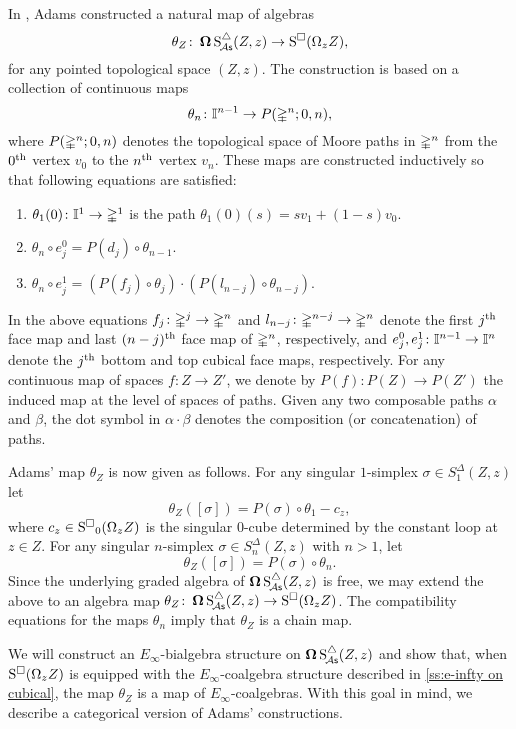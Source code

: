 In \cite{adams1956cobar}, Adams constructed a natural map of algebras
\begin{equation} \label{e:adams map 2}
\theta_Z \colon \operatorname{\mathbf{\Omega}} \operatorname{S^{\triangle}_{\!{\mathcal{A}\mathsf{s}}}}(Z,z) \to \operatorname{S^{\square}}(\Omega_z Z),
\end{equation}
for any pointed topological space $(Z,z)$.
The construction is based on a collection of continuous maps
\[
\theta_n \colon \mathbb{I}^{n-1} \to P(\mathbb{\Delta}^n;0,n),
\]
where $P(\mathbb{\Delta}^n;0,n)$ denotes the topological space of Moore paths in $\mathbb{\Delta}^n$ from the $0^{\mathrm{th}}$ vertex $v_0$ to the $n^{\mathrm{th}}$ vertex $v_n$.
These maps are constructed inductively so that following equations are satisfied:
\begin{enumerate}
	\item $\theta_1(0)\colon \mathbb{I}^1 \to \mathbb{\Delta}^1$ is the path $\theta_1(0)(s) = sv_1 +(1-s)v_0$.
	\item $\theta_n \circ e_j^0 = P(d_j) \circ \theta_{n-1}$.
	\item $\theta_n \circ e_j^1 = (P(f_j) \circ \theta_j) \cdot (P(l_{n-j}) \circ \theta_{n-j})$.
\end{enumerate}
In the above equations $f_j\colon \mathbb{\Delta}^j \rightarrow \mathbb{\Delta}^n$ and $l_{n-j}\colon \mathbb{\Delta}^{n-j} \rightarrow \mathbb{\Delta}^n$ denote the first $j^{\mathrm{th}}$ face map and last $(n-j)^{\mathrm{th}}$ face map of $\mathbb{\Delta}^n$, respectively, and
$e_j^0,e_j^1\colon \mathbb{I}^{n-1} \rightarrow \mathbb{I}^{n}$ denote the $j^{\mathrm{th}}$ bottom and top cubical face maps, respectively.
For any continuous map of spaces $f \colon Z \to Z'$, we denote by $P(f) \colon P(Z) \to P(Z')$ the induced map at the level of spaces of paths.
Given any two composable paths $\alpha$ and $\beta$, the dot symbol in $\alpha \cdot \beta$ denotes the composition (or concatenation) of paths.

Adams' map $\theta_Z$ is now given as follows.
For any singular $1$-simplex $\sigma \in S^{\Delta}_1(Z,z)$ let
\[
\theta_Z([\sigma]) = P(\sigma) \circ \theta_1 - c_z,
\]
where $c_z \in \operatorname{S^{\square}}_0(\Omega_z Z)$ is the singular $0$-cube determined by the constant loop at $z \in Z$.
For any singular $n$-simplex $\sigma \in S^{\Delta}_n(Z,z)$ with $n>1$, let
\[
\theta_Z([\sigma]) = P(\sigma) \circ \theta_n.
\]
Since the underlying graded algebra of $\operatorname{\mathbf{\Omega}} \operatorname{S^{\triangle}_{\!{\mathcal{A}\mathsf{s}}}}(Z,z)$ is free, we may extend the above to an algebra map $\theta_Z \colon \operatorname{\mathbf{\Omega}} \operatorname{S^{\triangle}_{\!{\mathcal{A}\mathsf{s}}}}(Z,z) \to \operatorname{S^{\square}}(\Omega_z Z)$.
The compatibility equations for the maps $\theta_n$ imply that $\theta_Z$ is a chain map.

We will construct an $E_{\infty}$-bialgebra structure on $\operatorname{\mathbf{\Omega}} \operatorname{S^{\triangle}_{\!{\mathcal{A}\mathsf{s}}}}(Z,z)$ and show that, when $\operatorname{S^{\square}}(\Omega_z Z)$ is equipped with the $E_{\infty}$-coalgebra structure described in \cref{ss:e-infty on cubical}, the map $\theta_Z$ is a map of $E_{\infty}$-coalgebras.
With this goal in mind, we describe a categorical version of Adams' constructions.

